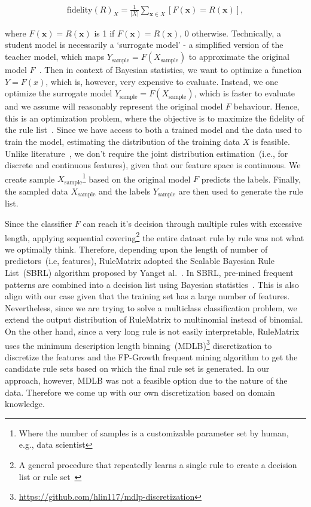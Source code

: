 \vspace{-6mm}
\begin{align}
    \text {fidelity}(R)_{{X}}=\frac{1}{|{X}|} \sum_{\boldsymbol{x} \in {X}}[F(\boldsymbol{x})=R(\boldsymbol{x})],
    \label{eq:fidelity}
\end{align}

\hspace*{3.5mm} where $F(\boldsymbol{x})=R(\boldsymbol{x})$ is 1 if $F(\boldsymbol{x})=R(\boldsymbol{x})$, 0 otherwise. Technically, a student model is necessarily a `surrogate model' - a simplified version of the teacher model, which maps $Y_\text{sample}=F(X_\text{sample})$ to approximate the original model $F$~\cite{forrester2008engineering}. Then in context of Bayesian statistics, we want to optimize a function $Y=F(x)$, which is, however, very expensive to evaluate. Instead, we one optimize the surrogate model $Y_\text{sample}=F(X_\text{sample})$, which is faster to evaluate and we assume will reasonably represent the original model $F$ behaviour. Hence, this is an optimization problem, where the objective is to maximize the fidelity of the rule list~\cite{ming2018rulematrix}. Since we have access to both a trained model and the data used to train the model, estimating the distribution of the training data ${X}$ is feasible. Unlike literature~\cite{ming2018rulematrix}, we don't require the joint distribution estimation~(i.e., for discrete and continuous features), given that our feature space is continuous. We create sample ${X}_{\text {sample}}$\footnote{Where the number of samples is a customizable parameter set by human, e.g., data scientist} based on the original model $F$ predicts the labels. Finally, the sampled data ${X}_{\text {sample}}$ and the labels ${Y}_{\text {sample}}$ are then used to generate the rule list.

\hspace*{3.5mm} Since the classifier $F$ can reach it's decision through multiple rules with excessive length, applying sequential covering\footnote{A general procedure that repeatedly learns a single rule to create a decision list or rule set~\cite{molnar2019interpretable}} the entire dataset rule by rule was not what we optimally think. Therefore, depending upon the length of number of predictors~(i.e, features), RuleMatrix adopted the Scalable Bayesian Rule List~(SBRL) algorithm proposed by Yanget al.~\cite{BayesianRule}. In SBRL, pre-mined frequent patterns are combined into a decision list using Bayesian statistics~\cite{molnar2019interpretable}. 
This is also align with our case given that the training set has a large number of features. Nevertheless, since we are trying to solve a multiclass classification problem, we extend the output distribution of RuleMatrix to multinomial instead of binomial. On the other hand, since a very long rule is not easily interpretable, RuleMatrix uses the minimum description length binning~(MDLB)\footnote{\url{https://github.com/hlin117/mdlp-discretization}} discretization to discretize the features and the FP-Growth frequent mining algorithm to get the candidate rule sets based on which the final rule set is generated. In our approach, however, MDLB was not a feasible option due to the nature of the data. Therefore we come up with our own discretization based on domain knowledge.

